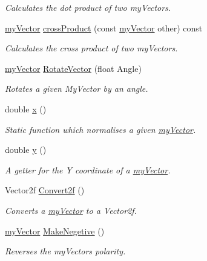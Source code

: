 \begin{DoxyCompactItemize}
\begin{DoxyCompactList}\small\item\em Calculates the dot product of two my\+Vectors. \end{DoxyCompactList}\item 
\hyperlink{classmy_vector}{my\+Vector} \hyperlink{classmy_vector_af05be0fcb82238606e624b97eef10990}{cross\+Product} (const \hyperlink{classmy_vector}{my\+Vector} other) const 
\begin{DoxyCompactList}\small\item\em Calculates the cross product of two my\+Vectors. \end{DoxyCompactList}\item 
\hyperlink{classmy_vector}{my\+Vector} \hyperlink{classmy_vector_a417556fbd4eda0e98ae1b76973bb75b4}{Rotate\+Vector} (float Angle)
\begin{DoxyCompactList}\small\item\em Rotates a given My\+Vector by an angle. \end{DoxyCompactList}\item 
double \hyperlink{classmy_vector_a240764ad5e79de7a6ce9e950bc531682}{x} ()
\begin{DoxyCompactList}\small\item\em Static function which normalises a given \hyperlink{classmy_vector}{my\+Vector}. \end{DoxyCompactList}\item 
double \hyperlink{classmy_vector_a940c23ee317384a6fd3b4588986ad3cb}{y} ()
\begin{DoxyCompactList}\small\item\em A getter for the Y coordinate of a \hyperlink{classmy_vector}{my\+Vector}. \end{DoxyCompactList}\item 
Vector2f \hyperlink{classmy_vector_a2a99754a40661435447dd17138e8f63a}{Convert2f} ()
\begin{DoxyCompactList}\small\item\em Converts a \hyperlink{classmy_vector}{my\+Vector} to a Vector2f. \end{DoxyCompactList}\item 
\hyperlink{classmy_vector}{my\+Vector} \hyperlink{classmy_vector_a6d039a25169b58a8164f8f979d8b315b}{Make\+Negetive} ()
\begin{DoxyCompactList}\small\item\em Reverses the my\+Vectors polarity. \end{DoxyCompactList}\end{DoxyCompactItemize}
